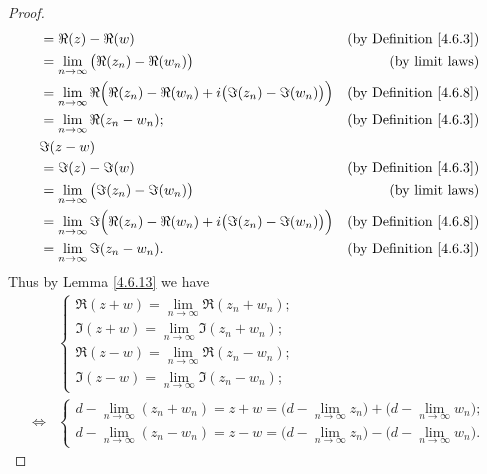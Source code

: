 \begin{proof}
\begin{align*}
         & = \Re(z) - \Re(w)                                                                        & \text{(by Definition \ref{4.6.3})} \\
         & = \lim_{n \to \infty} \big(\Re(z_n) - \Re(w_n)\big)                                      & \text{(by limit laws)}             \\
         & = \lim_{n \to \infty} \Re\Big(\Re(z_n) - \Re(w_n) + i \big(\Im(z_n) - \Im(w_n)\big)\Big) & \text{(by Definition \ref{4.6.8})} \\
         & = \lim_{n \to \infty} \Re(z_n - w_n);                                                    & \text{(by Definition \ref{4.6.3})} \\
         & \Im(z - w)                                                                                                                    \\
         & = \Im(z) - \Im(w)                                                                        & \text{(by Definition \ref{4.6.3})} \\
         & = \lim_{n \to \infty} \big(\Im(z_n) - \Im(w_n)\big)                                      & \text{(by limit laws)}             \\
         & = \lim_{n \to \infty} \Im\Big(\Re(z_n) - \Re(w_n) + i \big(\Im(z_n) - \Im(w_n)\big)\Big) & \text{(by Definition \ref{4.6.8})} \\
         & = \lim_{n \to \infty} \Im(z_n - w_n).                                                    & \text{(by Definition \ref{4.6.3})} \\
    \end{align*}
    Thus by Lemma \ref{4.6.13} we have
    \begin{align*}
             & \begin{cases}
                   \Re(z + w) = \lim_{n \to \infty} \Re(z_n + w_n); \\
                   \Im(z + w) = \lim_{n \to \infty} \Im(z_n + w_n); \\
                   \Re(z - w) = \lim_{n \to \infty} \Re(z_n - w_n); \\
                   \Im(z - w) = \lim_{n \to \infty} \Im(z_n - w_n);
               \end{cases}                                                                             \\
        \iff & \begin{cases}
                   d - \lim_{n \to \infty} (z_n + w_n) = z + w = \big(d - \lim_{n \to \infty} z_n\big) + \big(d - \lim_{n \to \infty} w_n\big); \\
                   d - \lim_{n \to \infty} (z_n - w_n) = z - w = \big(d - \lim_{n \to \infty} z_n\big) - \big(d - \lim_{n \to \infty} w_n\big).
               \end{cases}
    \end{align*}


\end{proof}
